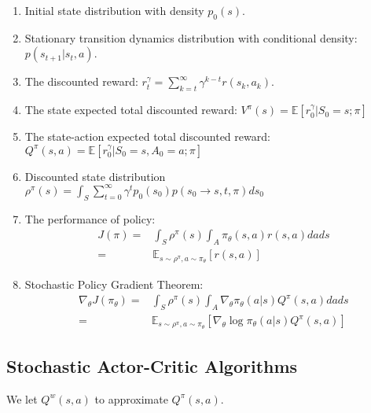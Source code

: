 \documentclass[a4paper]{article}
\begin{document}
\begin{enumerate}
    \item Initial state distribution with density $ p_0(s) $.
    \item Stationary transition dynamics distribution with conditional density: $ p(s _{t+1} | s_t, a) $.
    \item The discounted reward: $ r^\gamma_t = \sum^{\infty}_{k=t} \gamma ^{k-t} r(s_k, a_k) $.
    \item The state expected total discounted reward: $ V^\pi(s) = \mathbb{E} [ r^\gamma_0 | S_0 = s; \pi ] $ 
    \item The state-action expected total discounted reward:
        $ Q^\pi(s, a) = \mathbb{E} [ r^\gamma_0 | S_0 = s, A_0 = a; \pi] $ 
    \item Discounted state distribution $ \rho^\pi(s) = \int_S \sum^{\infty}_{t=0} \gamma^t p_0(s_0) p(s_0 \rightarrow s, t, \pi) ds_0 $ 
    \item The performance of policy:
        \begin{align*}
            J(\pi) =& \int_S \rho^\pi(s) \int_A \pi_\theta(s,a) r(s,a) da ds \\
            =& \mathbb{E}_{s\sim\rho^\pi, a\sim\pi_\theta} [r(s, a)]
        \end{align*}
    \item Stochastic Policy Gradient Theorem:
        \begin{align*}
            \nabla_\theta J(\pi_\theta) =& \int_S \rho^\pi(s) \int_A \nabla_\theta \pi_\theta(a | s) Q^\pi(s,a) da ds \\
            =& \mathbb{E}_{s\sim \rho^\pi, a \sim \pi_\theta}
            [ \nabla_\theta \log \pi_\theta (a | s) Q^\pi(s, a) ]
        \end{align*}
\end{enumerate}

\subsection{Stochastic Actor-Critic Algorithms}%
\label{sub:stochastic_actor_critic_algorithms}

We let $ Q^w(s,a) $ to approximate $ Q^\pi(s, a) $. 
\end{document}
